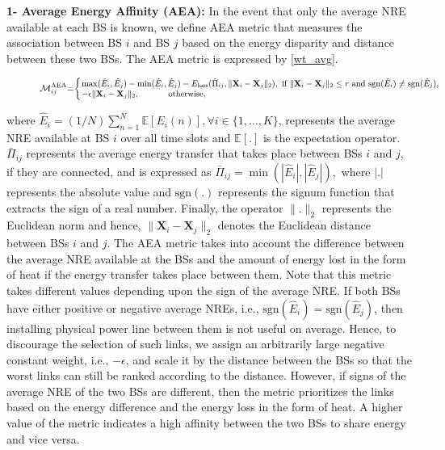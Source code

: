 \documentclass[10pt, letter,twocolumn]{IEEEtran}
\begin{document}
\textbf{1- Average Energy Affinity (AEA):} In the event that only the average NRE available at each BS is known, we define AEA metric that measures the association between BS $i$ and BS $j$ based on the energy disparity and distance between these two BSs. The AEA metric is expressed by \eqref{wt_avg}.
\begin{figure*}
\begin{align}\label{wt_avg}
\small
\mathcal{M}^{\text{AEA}}_{ij} \hspace{-0.1cm} = \hspace{-0.1cm}
\left\{
	\begin{array}{ll}
        \hspace{-0.15cm}\max(\hat{E}_{i},\hat{E}_{j}) - \min(\hat{E}_{i},\hat{E}_{j}) - E_{\text{loss}}(\hat{\Pi}_{ij},\|\mathbf{X}_{i} - \mathbf{X}_{j} \|_{2}), \mbox{ \text{if} } \|\mathbf{X}_{i} - \mathbf{X}_{j}\|_{2} \leq r \text{ and } \text{sgn}(\hat{E}_{i}) \neq \text{sgn}(\hat{E}_{j}), \\
      \hspace{-0.15cm}  - \epsilon \|\mathbf{X}_{i} - \mathbf{X}_{j}\|_{2}, \hspace{1cm } \mbox{ \text{otherwise}},
\end{array}
\right.
\end{align}
\end{figure*}
where $\hat{E}_{i} = (1/N)\sum_{n = 1}^{N} \mathbb{E}[E_{i}(n)], \forall i \in \{ 1, \ldots, K\}$, represents the average NRE available at BS $i$ over all time slots and $\mathbb{E[.]}$ is the expectation operator. $\bar{\Pi}_{ij}$ represents the average energy transfer that takes place between BSs $i$ and $j$, if they are connected, and is expressed as $\bar{\Pi}_{ij} =		\min(|\hat{E}_{i}|,|\hat{E}_{j}|),$ where $|.|$ represents the absolute value and $\text{sgn}(.)$ represents the signum function that extracts the sign of a real number. Finally, the operator $\|.\|_{2}$ represents the Euclidean norm and hence, $\|\mathbf{X}_{i} - \mathbf{X}_{j}\|_{2}$ denotes the Euclidean distance between BSs $i$ and $j$. The AEA metric takes into account the difference between the average NRE available at the BSs and the amount of energy lost in the form of heat if the energy transfer takes place between them. Note that this metric takes different values depending upon the sign of the average NRE. If both BSs have either positive or negative average NREs, i.e., $\text{sgn}(\hat{E}_{i}) = \text{sgn}(\hat{E}_{j})$, then installing physical power line between them is not useful on average. Hence, to discourage the selection of such links, we assign an arbitrarily large negative constant weight, i.e., $-\epsilon$, and scale it by the distance between the BSs so that the worst links can still be ranked according to the distance. However, if signs of the average NRE of the two BSs are different, then the metric prioritizes the links based on the energy difference and the energy loss in the form of heat. A higher value of the metric indicates a high affinity between the two BSs to share energy and vice versa.
\end{document}
